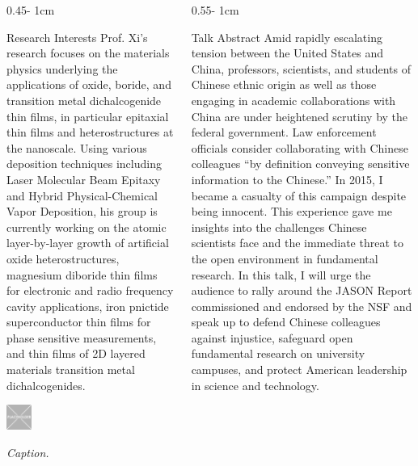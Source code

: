 \documentclass{../psuposter}
\begin{document}
\begin{frame}
\begin{columns}[t, totalwidth=\textwidth]
\begin{column}{0.45\textwidth - 1cm}
    \begin{block}{Research Interests}
        Prof. Xi’s research focuses on the materials physics underlying the applications of oxide, boride, and transition metal dichalcogenide thin films, in particular epitaxial thin films and heterostructures at the nanoscale. Using various deposition techniques including Laser Molecular Beam Epitaxy and Hybrid Physical-Chemical Vapor Deposition, his group is currently working on the atomic layer-by-layer growth of artificial oxide heterostructures, magnesium diboride thin films for electronic and radio frequency cavity applications, iron pnictide superconductor thin films for phase sensitive measurements, and thin films of 2D layered materials transition metal dichalcogenides. 
        \begin{center}
	    	\includegraphics[width=0.15\textwidth]{images/research}    
	    	
	    	\textit{Caption.} 
    	\end{center}
    	
    \end{block}
\end{column}
\begin{column}{0.55\textwidth - 1cm}


    \begin{block}{Talk Abstract}
    	Amid rapidly escalating tension between the United States and China, professors, scientists, and students of Chinese ethnic origin as well as those engaging in academic collaborations with China are under heightened scrutiny by the federal government. Law enforcement officials consider collaborating with Chinese colleagues “by definition conveying sensitive information to the Chinese.” In 2015, I became a casualty of this campaign despite being innocent. This experience gave me insights into the challenges Chinese scientists face and the immediate threat to the open environment in fundamental research. In this talk, I will urge the audience to rally around the JASON Report commissioned and endorsed by the NSF and speak up to defend Chinese colleagues against injustice, safeguard open fundamental research on university campuses, and protect American leadership in science and technology.
    \end{block}



\end{column}
\end{columns}
\end{frame}
\end{document}
